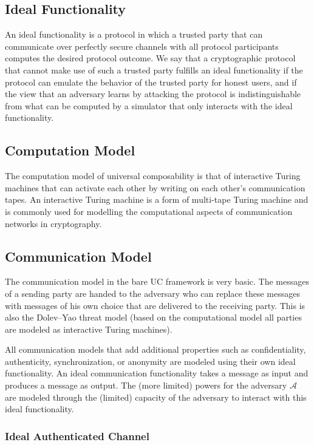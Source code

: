 \documentclass[11pt,a4paper]{report}
\theoremstyle{definition}
\theoremstyle{remark}
\begin{document}
\subsection{Ideal Functionality}

An ideal functionality is a protocol in which a trusted party that can
communicate over perfectly secure channels with all protocol participants
computes the desired protocol outcome. We say that a cryptographic protocol that
cannot make use of such a trusted party fulfills an ideal functionality if the
protocol can emulate the behavior of the trusted party for honest users, and if
the view that an adversary learns by attacking the protocol is indistinguishable
from what can be computed by a simulator that only interacts with the ideal
functionality.

\subsection{Computation Model}

The computation model of universal composability is that of interactive Turing
machines that can activate each other by writing on each other's communication
tapes. An interactive Turing machine is a form of multi-tape Turing machine and
is commonly used for modelling the computational aspects of communication
networks in cryptography.

\subsection{Communication Model}

The communication model in the bare UC framework is very basic. The messages of
a sending party are handed to the adversary who can replace these messages with
messages of his own choice that are delivered to the receiving party. This is
also the Dolev–Yao threat model (based on the computational model all parties
are modeled as interactive Turing machines).

All communication models that add additional properties such as confidentiality,
authenticity, synchronization, or anonymity are modeled using their own ideal
functionality. An ideal communication functionality takes a message as input and
produces a message as output. The (more limited) powers for the adversary
$\mathcal{A}$ are modeled through the (limited) capacity of the adversary to
interact with this ideal functionality.

\subsubsection{Ideal Authenticated Channel}
\end{document}
